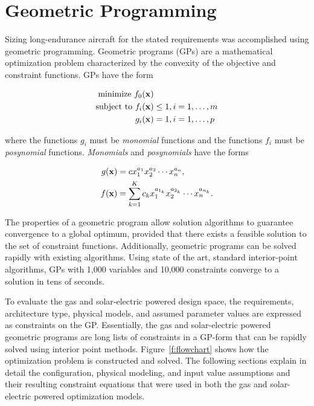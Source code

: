 \section{Geometric Programming}

Sizing long-endurance aircraft for the stated requirements was accomplished using geometric programming. 
Geometric programs (GPs) are a mathematical optimization problem characterized by the convexity of the objective and constraint functions.\cite{gp} GPs have the form

\begin{align} 
\label{e:gpform}
\text{minimize } f_0(\bold{x}) & \nonumber \\
\text{subject to  } f_i(\bold{x}) &\leq 1, i=1,\ldots,m \\
g_i (\bold{x}) &= 1, i = 1,\ldots,p 
\end{align}

where the functions $g_i$ must be \emph{monomial} functions and the functions $f_i$ must be \emph{posynomial} functions. \emph{Monomials} and \emph{posynomials} have the forms

\begin{align}
 \label{e:mon}
g(\bold{x}) &= c x_1^{a_1} x_2^{a_2} \dotsm x_n^{a_n} , \\
\label{e:pos}
f(\bold{x}) &= \displaystyle\sum_{k=1}^K c_k x_1^{a_{1_k}} x_2^{a_{2_k}} \dotsm x_n^{a_{n_k}}.
\end{align}

The properties of a geometric program allow solution algorithms to guarantee convergence to a global optimum, provided that there exists a feasible solution to the set of constraint functions.  
Additionally, geometric programs can be solved rapidly with existing algorithms.  
Using state of the art, standard interior-point algorithms, GPs with 1,000 variables and 10,000 constraints converge to a solution in tens of seconds.\cite{gp}  

To evaluate the gas and solar-electric powered design space, the requirements, architecture type, physical models, and assumed parameter values are expressed as constraints on the GP.\cite{hoburgthesis} 
Essentially, the gas and solar-electric powered geometric programs are long lists of constraints in a GP-form that can be rapidly solved using interior point methods.  
Figure~\ref{f:flowchart} shows how the optimization problem is constructed and solved. 
The following sections explain in detail the configuration, physical modeling, and input value assumptions and their resulting constraint equations that were used in both the gas and solar-electric powered optimization models.

